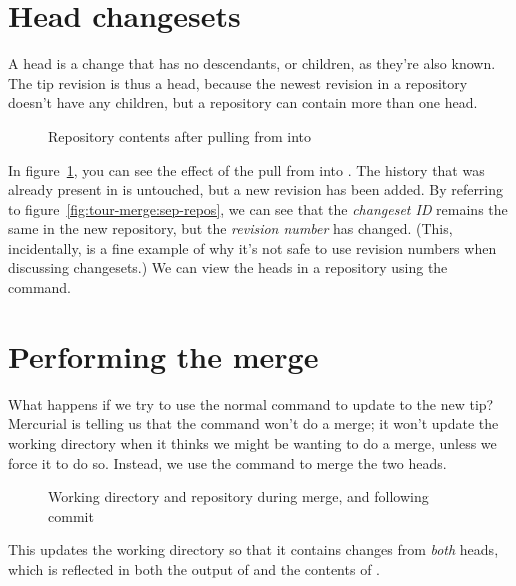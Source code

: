 \section{Head changesets}

A head is a change that has no descendants, or children, as they're
also known.  The tip revision is thus a head, because the newest
revision in a repository doesn't have any children, but a repository
can contain more than one head.

\begin{figure}[ht]
  \centering
  \caption{Repository contents after pulling from  into
    }
  \label{fig:tour-merge:pull}
\end{figure}

In figure~\ref{fig:tour-merge:pull}, you can see the effect of the
pull from  into .  The history
that was already present in  is untouched, but a
new revision has been added.  By referring to
figure~\ref{fig:tour-merge:sep-repos}, we can see that the
\emph{changeset ID} remains the same in the new repository, but the
\emph{revision number} has changed.  (This, incidentally, is a fine
example of why it's not safe to use revision numbers when discussing
changesets.)  We can view the heads in a repository using the
 command.

\section{Performing the merge}

What happens if we try to use the normal  command to
update to the new tip?
Mercurial is telling us that the  command won't do a
merge; it won't update the working directory when it thinks we might
be wanting to do a merge, unless we force it to do so.  Instead, we
use the  command to merge the two heads.

\begin{figure}[ht]
  \centering
  \caption{Working directory and repository during merge, and
    following commit}
  \label{fig:tour-merge:merge}
\end{figure}

This updates the working directory so that it contains changes from
\emph{both} heads, which is reflected in both the output of
 and the contents of .

